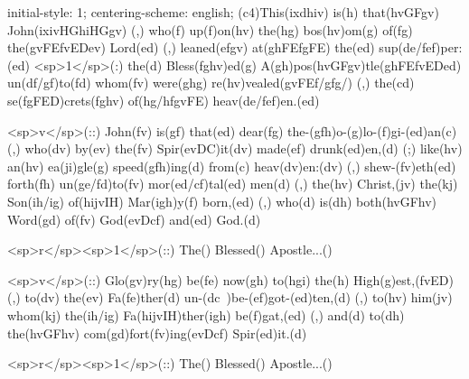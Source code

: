 initial-style: 1;
centering-scheme: english;
(c4)This(ixdhiv) is(h) that(hvGFgv) John(ixivHGhiHGgv) (,) who(f) up(f)on(hv) the(hg) bos(hv)om(g) of(fg) the(gvFEfvEDev) Lord(ed) (,) leaned(efgv) at(ghFEfgFE) the(ed) sup(de/fef)per:(ed) <sp>1</sp>(:) the(d) Bless(fghv)ed(g) A(gh)pos(hvGFgv)tle(ghFEfvEDed) un(df/gf)to(fd) whom(fv) were(ghg) re(hv)vealed(gvFEf/gfg/) (,) the(cd) se(fgFED)crets(fghv) of(hg/hfgvFE) heav(de/fef)en.(ed) 

<sp>v</sp>(::) John(fv) is(gf) that(ed) dear(fg) the-(gfh)o-(g)lo-(f)gi-(ed)an(c) (,) who(dv) by(ev) the(fv) Spir(evDC)it(dv) made(ef) drunk(ed)en,(d) (;) like(hv) an(hv) ea(ji)gle(g) speed(gfh)ing(d) from(c) heav(dv)en:(dv) (,) shew-(fv)eth(ed) forth(fh) un(ge/fd)to(fv) mor(ed/cf)tal(ed) men(d) (,) the(hv) Christ,(jv) the(kj) Son(ih/ig) of(hijvIH) Mar(igh)y(f) born,(ed) (,) who(d) is(dh) both(hvGFhv) Word(gd) of(fv) God(evDcf) and(ed) God.(d)

<sp>r</sp><sp>1</sp>(::) The() Blessed() Apostle...()

<sp>v</sp>(::) Glo(gv)ry(hg) be(fe) now(gh) to(hgi) the(h) High(g)est,(fvED) (,) to(dv) the(ev) Fa(fe)ther(d) un-(dc~)be-(ef)got-(ed)ten,(d) (,) to(hv) him(jv) whom(kj) the(ih/ig) Fa(hijvIH)ther(igh) be(f)gat,(ed) (,) and(d) to(dh) the(hvGFhv) com(gd)fort(fv)ing(evDcf) Spir(ed)it.(d)

<sp>r</sp><sp>1</sp>(::) The() Blessed() Apostle...()